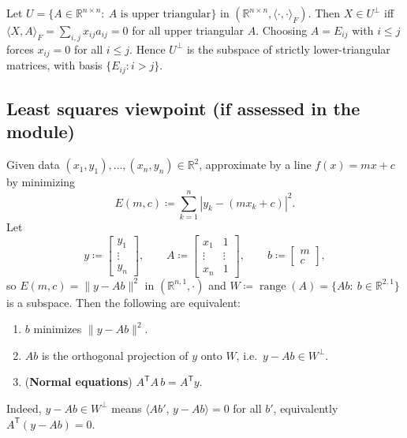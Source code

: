 \begin{examplebox}[title={Worked Example (Lecture Week 12): upper-triangular matrices and $U^\perp$}]
Let $U=\{A\in\mathbb{R}^{n\times n}:\ A\text{ is upper triangular}\}$ in $(\mathbb{R}^{n\times n},\langle\cdot,\cdot\rangle_F)$.
Then $X\in U^\perp$ iff $\langle X,A\rangle_F=\sum_{i,j}x_{ij}a_{ij}=0$ for all upper triangular $A$.
Choosing $A=E_{ij}$ with $i\le j$ forces $x_{ij}=0$ for all $i\le j$.
Hence $U^\perp$ is the subspace of strictly lower-triangular matrices, with basis $\{E_{ij}: i>j\}$.
\end{examplebox}

\subsection{Least squares viewpoint (if assessed in the module)}

\begin{examplebox}[title={Lecture Week 12: linear least squares and normal equations}]
Given data $(x_1,y_1),\dots,(x_n,y_n)\in\mathbb{R}^2$, approximate by a line $f(x)=mx+c$ by minimizing
\[
E(m,c)\coloneqq \sum_{k=1}^n |y_k-(mx_k+c)|^2.
\]
Let
\[
y\coloneqq \begin{bmatrix}y_1\\ \vdots\\ y_n\end{bmatrix},
\qquad
A\coloneqq \begin{bmatrix}
x_1 & 1\\
\vdots & \vdots\\
x_n & 1
\end{bmatrix},
\qquad
b\coloneqq \begin{bmatrix}m\\ c\end{bmatrix},
\]
so $E(m,c)=\|y-Ab\|^2$ in $(\mathbb{R}^{n,1},\cdot)$ and $W\coloneqq \operatorname{range}(A)=\{Ab:\ b\in\mathbb{R}^{2,1}\}$ is a subspace.
Then the following are equivalent:
\begin{enumerate}[leftmargin=*]
\item $b$ minimizes $\|y-Ab\|^2$.
\item $Ab$ is the orthogonal projection of $y$ onto $W$, i.e.\ $y-Ab\in W^\perp$.
\item (\textbf{Normal equations}) $A^{\mathsf T}A\,b=A^{\mathsf T}y$.
\end{enumerate}
Indeed, $y-Ab\in W^\perp$ means $\langle Ab',\,y-Ab\rangle=0$ for all $b'$, equivalently $A^{\mathsf T}(y-Ab)=0$.
\end{examplebox}

